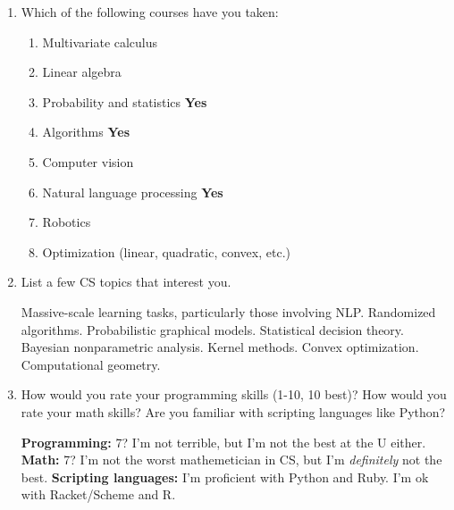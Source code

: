 \documentclass[12pt]{article}
\begin{document}

\begin{enumerate}

\item Which of the following courses have you taken:

      \begin{enumerate}
      \item Multivariate calculus
      \item Linear algebra
      \item Probability and statistics \textbf{Yes}
      \item Algorithms \textbf{Yes}
      \item Computer vision
      \item Natural language processing \textbf{Yes}
      \item Robotics
      \item Optimization (linear, quadratic, convex, etc.)
      \end{enumerate}


\item List a few CS topics that interest you.

\begin{solution}
Massive-scale learning tasks, particularly those involving NLP. Randomized algorithms. Probabilistic graphical models. Statistical decision theory. Bayesian nonparametric analysis. Kernel methods. Convex optimization. Computational geometry.
\end{solution}

\item How would you rate your programming skills (1-10, 10 best)?  How
would you rate your math skills?  Are you familiar with scripting
languages like Python?

\begin{solution}
\textbf{Programming:} 7? I'm not terrible, but I'm not the best at the U either. \newline
\textbf{Math:} 7? I'm not the worst mathemetician in CS, but I'm \textit{definitely} not the best. \newline
\textbf{Scripting languages:} I'm proficient with Python and Ruby. I'm ok with Racket/Scheme and R.
\end{solution}


\end{enumerate}
\end{document}

